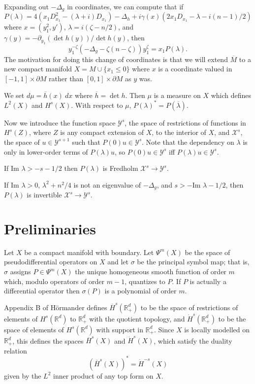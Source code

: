 \documentclass[12pt]{article}
\newcommand{\RR}{\mathbb{R}}
\begin{document}
Expanding out $-\Delta_g$ in coordinates, we can compute that if
$$P(\lambda) = 4(x_1D_{x_1}^2 - (\lambda + i)D_{x_1}) - \Delta_h +i\gamma(x)(2x_1D_{x_1} - \lambda - i(n-1)/2)$$
where $x = (y_1^2, y')$, $\lambda = i(\zeta - n/2)$, and $\gamma(y) = -\partial_{y_1}(\det h(y))/\det h(y)$, then
$$y_1^{-\zeta}(-\Delta_g - \zeta(n-\zeta))y_1^\zeta = x_1 P(\lambda).$$
The motivation for doing this change of coordinates is that we will extend $\overline M$ to a new compact manifold $X = M \cup \{x_1 \leq 0\}$ where $x$ is a coordinate valued in $[-1, 1] \times \partial M$ rather than $[0, 1] \times \partial M$ as $y$ was.

We set $d\mu = \overline h(x) ~dx$ where $\overline h = \det h$.
Then $\mu$ is a measure on $X$ which defines $L^2(X)$ and $H^s(X)$.
With respect to $\mu$, $P(\lambda)^* = P(\overline \lambda)$.

Now we introduce the function space $\mathcal Y^s$, the space of restrictions of functions in $H^s(Z)$, where $Z$ is any compact extension of $X$, to the interior of $X$, and $\mathcal X^s$, the space of $u \in \mathcal Y^{s+1}$ such that $P(0)u \in \mathcal Y^s$.
Note that the dependency on $\lambda$ is only in lower-order terms of $P(\lambda)u$, so $P(0)u \in \mathcal Y^s$ iff $P(\lambda)u \in \mathcal Y^s$.

\begin{theorem}
If $\text{Im } \lambda > - s - 1/2$ then $P(\lambda)$ is Fredholm $\mathcal X^s \to \mathcal Y^s$.
\end{theorem}

\begin{theorem}
If $\text{Im } \lambda > 0$, $\lambda^2 + n^2/4$ is not an eigenvalue of $-\Delta_g$, and $s > -\text{Im } \lambda - 1/2$, then $P(\lambda)$ is invertible $\mathcal X^s \to \mathcal Y^s$.
\end{theorem}

\section{Preliminaries}
Let $X$ be a compact manifold with boundary.
Let $\Psi^m(X)$ be the space of pseudodifferential operators on $X$ and let $\sigma$ be the principal symbol map; that is, $\sigma$ assigns $P \in \Psi^m(X)$ the unique homogeneous smooth function of order $m$ which, modulo operators of order $m - 1$, quantizes to $P$.
If $P$ is actually a differential operator then $\sigma(P)$ is a polynomial of order $m$.

Appendix B of H\"ormander defines $\overline H^s(\RR^d_+)$ to be the space of restrictions of elements of $H^s(\RR^d)$ to $\RR_+^d$ with the quotient topology, and $\dot H^s(\RR^d_+)$ to be the space of elements of $H^s(\RR^d)$ with support in $\RR_+^d$.
Since $X$ is locally modelled on $\RR_+^d$, this defines the spaces $\overline H^s(X)$ and $\dot H^s(X)$, which satisfy the duality relation
$$(\overline H^s(X))^* = \dot H^{-s}(X)$$
given by the $L^2$ inner product of any top form on $X$.
\end{document}
